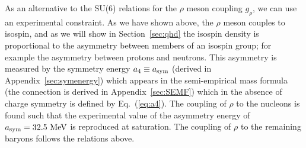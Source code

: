 \documentclass[11pt,a4paper,twoside]{carrollthesis}
\newcommand{\be}{\begin{equation}}
\newcommand{\ee}{\end{equation}}
\begin{document}
As an alternative to the SU(6) relations for the $\rho$ meson coupling
$g_\rho$, we can use an experimental constraint. As we have shown
above, the $\rho$ meson couples to isospin, and as we will show in
Section~\ref{sec:qhd} the isospin density is proportional to the
asymmetry between members of an isospin group; for example the
asymmetry between protons and neutrons. This asymmetry is measured by
the symmetry energy $a_4 \equiv a_{\rm sym}$ (derived in
Appendix~\ref{sec:symenergy}) which appears in the semi-empirical mass
formula (the connection is derived in Appendix~\ref{sec:SEMF}) which
in the absence of charge symmetry is defined by Eq.~(\ref{eq:a4}).
%
%
The coupling of $\rho$ to the nucleons is found such that the
experimental value of the asymmetry energy of $a_{\rm sym} = 32.5~{\rm
  MeV}$ is reproduced at saturation. The coupling of $\rho$ to the
remaining baryons follows the relations above.\par
%
\end{document}
